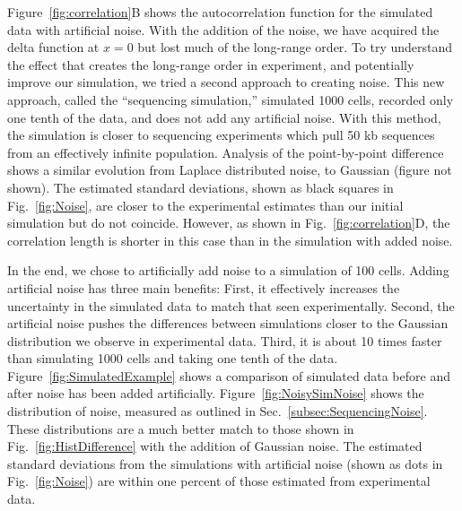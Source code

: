 		Figure~\ref{fig:correlation}B shows the autocorrelation function for the simulated data with artificial noise.
		With the addition of the noise, we have acquired the delta function at $x=0$ but lost much of the long-range order.
		To try understand the effect that creates the long-range order in experiment, and potentially improve our simulation, we tried a second approach to creating noise.
		This new approach, called the ``sequencing simulation,'' simulated 1000 cells, recorded only one tenth of the data, and does not add any artificial noise.
		With this method, the simulation is closer to sequencing experiments which pull 50 kb sequences from an effectively infinite population.
		Analysis of the point-by-point difference shows a similar evolution from Laplace distributed noise, to Gaussian (figure not shown).
		The estimated standard deviations, shown as black squares in Fig.~\ref{fig:Noise}, are closer to the experimental estimates than our initial simulation but do not coincide.
		However, as shown in Fig.~\ref{fig:correlation}D, the correlation length is shorter in this case than in the simulation with added noise.
		
		In the end, we chose to artificially add noise to a simulation of 100 cells.
		Adding artificial noise has three main benefits:
		First, it effectively increases the uncertainty in the simulated data to match that seen experimentally.
		Second, the artificial noise pushes the differences between simulations closer to the Gaussian distribution we observe in experimental data.
		Third, it is about 10 times faster than simulating 1000 cells and taking one tenth of the data.
		Figure~\ref{fig:SimulatedExample} shows a comparison of simulated data before and after noise has been added artificially.
		Figure~\ref{fig:NoisySimNoise} shows the distribution of noise, measured as outlined in Sec.~\ref{subsec:SequencingNoise}.
		These distributions are a much better match to those shown in Fig.~\ref{fig:HistDifference} with the addition of Gaussian noise.
		The estimated standard deviations from the simulations with artificial noise (shown as dots in Fig.~\ref{fig:Noise}) are within one percent of those estimated from experimental data.
		
